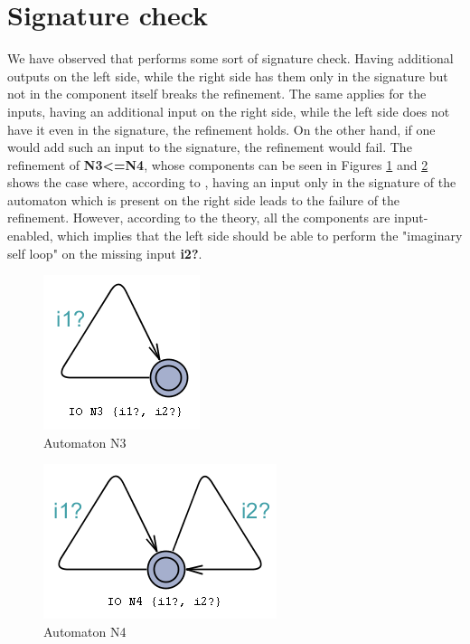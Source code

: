 \section{Signature check}\label{sec:signatureCheck}
We have observed that \ecdar performs some sort of signature check. Having additional outputs on the left side, while the right side has them only in the signature but not in the component itself breaks the refinement. The same applies for the inputs, having an additional input on the right side, while the left side does not have it even in the signature, the refinement holds. On the other hand, if one would add such an input to the signature, the refinement would fail. The refinement of \textbf{N3<=N4}, whose components can be seen in Figures \ref{fig:N3} and \ref{fig:N4} shows the case where, according to \ecdar, having an input only in the signature of the automaton which is present on the right side leads to the failure of the refinement. However, according to the theory, all the components are input-enabled, which implies that the left side should be able to perform the "imaginary self loop" on the missing input \textbf{i2?}. 

\begin{figure}
    \centering
    \includegraphics[scale = 0.7]{figures/N3.png}
    \caption{Automaton N3}
    \label{fig:N3}
\end{figure}
\begin{figure}
    \centering
    \includegraphics[scale = 0.7]{figures/N4.png}
    \caption{Automaton N4}
    \label{fig:N4}
\end{figure}

